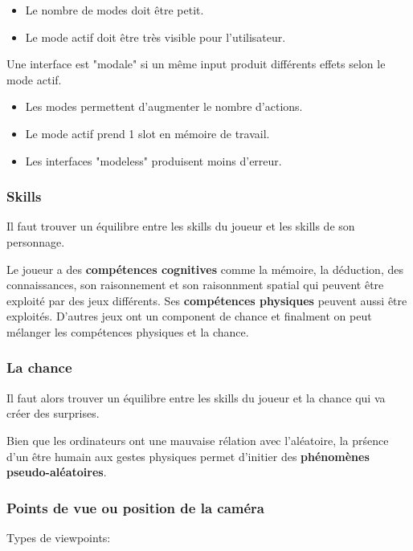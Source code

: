 \begin{itemize}
\item Le nombre de modes doit \^etre petit.
\item Le mode actif doit \^etre tr\`es visible pour l'utilisateur.
\end{itemize}

Une interface est "modale" si un m\^eme input produit diff\'erents effets selon le mode actif.

\begin{itemize}
\item Les modes permettent d'augmenter le nombre d'actions.
\item Le mode actif prend 1 slot en m\'emoire de travail.
\item Les interfaces "modeless" produisent moins d'erreur.
\end{itemize}

\subsubsection{Skills}

Il faut trouver un \'equilibre entre les skills du joueur et les skills de son personnage. 

Le joueur a des 	\textbf{comp\'etences cognitives} comme la m\'emoire, la d\'eduction, des connaissances, son raisonnement et son raisonnment spatial qui peuvent \^etre exploit\'e par des jeux diff\'erents. Ses \textbf{comp\'etences physiques} peuvent aussi \^etre exploit\'es. D'autres jeux ont un component de chance et finalment on peut m\'elanger les comp\'etences physiques et la chance.

\subsubsection{La chance}

Il faut alors trouver un \'equilibre entre les skills du joueur et la chance qui va cr\'eer des surprises.

Bien que les ordinateurs ont une mauvaise r\'elation avec l'al\'eatoire, la pr\'sence d'un \^etre humain aux gestes physiques permet d'initier des \textbf{ph\'enom\`enes pseudo-al\'eatoires}.

\subsubsection{Points de vue ou position de la cam\'era}

Types de viewpoints:

